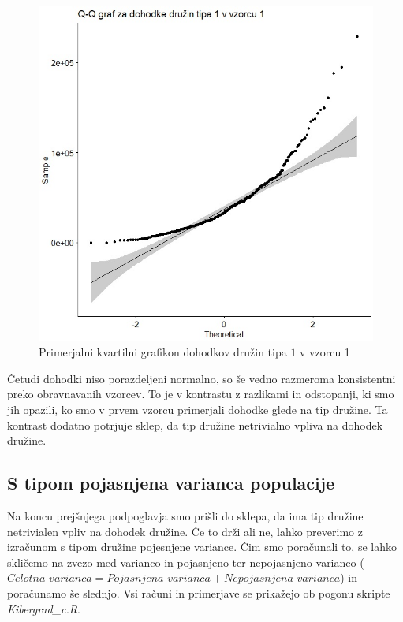 \documentclass[a4paper, 10pt]{article}
\begin{document}
	\begin{figure}[h!]
		\label{fig: qqplotB}
		\centering
		\includegraphics[scale = 0.5]{QQVzorec1}
		\caption{Primerjalni kvartilni grafikon dohodkov družin tipa $1$ v vzorcu 1}
	\end{figure}
	
	Četudi dohodki niso porazdeljeni normalno, so še vedno razmeroma konsistentni preko obravnavanih vzorcev. To je v kontrastu z razlikami in odstopanji, ki smo jih opazili, ko smo v prvem vzorcu primerjali dohodke glede na tip družine. Ta kontrast dodatno potrjuje sklep, da tip družine netrivialno vpliva na dohodek družine. 
	
	\subsection{S tipom pojasnjena varianca populacije}\label{subsect: 1C}
	Na koncu prejšnjega podpoglavja smo prišli do sklepa, da ima tip družine netrivialen vpliv na dohodek družine. Če to drži ali ne, lahko preverimo z izračunom s tipom družine pojesnjene variance. Čim smo poračunali to, se lahko skličemo na zvezo med varianco in pojasnjeno ter nepojasnjeno varianco ($Celotna\_varianca = Pojasnjena\_varianca + Nepojasnjena\_varianca$) in poračunamo še slednjo. Vsi računi in primerjave se prikažejo ob pogonu skripte \textit{Kibergrad\_c.R}. 
	
\end{document}
